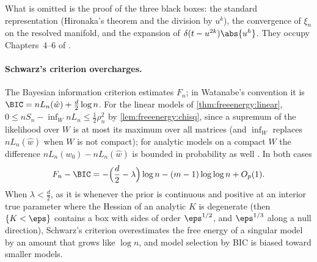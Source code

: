 \begin{refsection}
\begin{proofsketch}
What is omitted is the proof of the three black boxes: the standard representation (Hironaka's theorem and the division by $u^k$), the convergence of $\xi_n$ on the resolved manifold, and the expansion of $\delta(t-u^{2k})\abs{u^h}$. They occupy Chapters~4--6 of \textcite{Watanabe2009}.
\end{proofsketch}

\paragraph{Schwarz's criterion overcharges.} The Bayesian information criterion estimates $F_n$; in Watanabe's convention it is $\BIC=nL_n(\hat w)+\tfrac d2\log n$. For the linear models of \cref{thm:freeenergy:linear}, $0\le nS_n-\inf_WnL_n\le\frac12\rho_n^2$ by \cref{lem:freeenergy:chisq}, since a supremum of the likelihood over $W$ is at most its maximum over all matrices (and $\inf_W$ replaces $nL_n(\hat w)$ when $W$ is not compact); for analytic models on a compact $W$ the difference $nL_n(w_0)-nL_n(\hat w)$ is bounded in probability as well \parencite[citing Main Theorem~6.4 of the 2009 book]{Watanabe2013}. In both cases
\begin{equation}\label{eq:freeenergy:bic}
F_n-\BIC=-\Bigl(\frac d2-\lambda\Bigr)\log n-(m-1)\log\log n+O_p(1).
\end{equation}
When $\lambda<\frac d2$, as it is whenever the prior is continuous and positive at an interior true parameter where the Hessian of an analytic $K$ is degenerate (then $\{K<\eps\}$ contains a box with sides of order $\eps^{1/2}$, and $\eps^{1/3}$ along a null direction), Schwarz's criterion overestimates the free energy of a singular model by an amount that grows like $\log n$, and model selection by BIC is biased toward smaller models.


\end{refsection}
